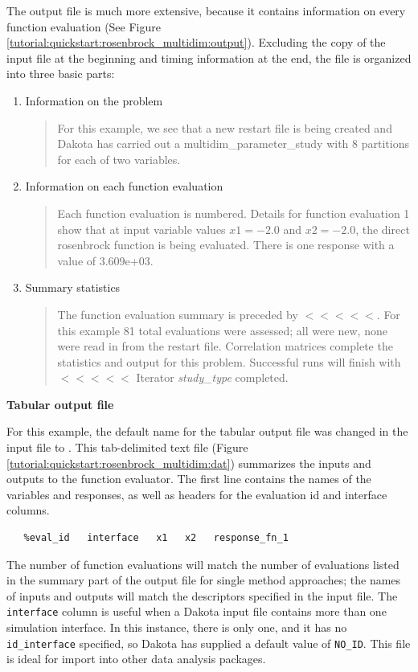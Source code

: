 The output file is much more extensive, because it
contains information on every function evaluation (See Figure
\ref{tutorial:quickstart:rosenbrock_multidim:output}). Excluding the
copy of the input file at the beginning and timing information at the end,
the file is organized into three basic parts:
\begin{enumerate}
\item Information on the problem
\begin{quote}
For this example, we see that a new restart file is being created
and Dakota has carried out a multidim\_parameter\_study with
8 partitions for each of two variables.
\end{quote}
\item Information on each function evaluation 
\begin{quote}
Each function evaluation is numbered. Details for function evaluation
1 show that at input variable values $x1= -2.0$ and $x2=-2.0$, 
the direct rosenbrock function is being evaluated.  There is one response
with a value of 3.609e+03.
\end{quote}
\item Summary statistics
\begin{quote}
The function evaluation summary is preceded by $<<<<<$. For this
example 81 total evaluations were assessed; all were new, none were
read in from the restart file. Correlation matrices complete the statistics
and output for this problem. Successful runs will finish with
$<<<<<$ Iterator {\it study\_type} completed.
\end{quote}
\end{enumerate}

{\textbf{Tabular output file}}

For this example, the default name for the tabular output file 
 was changed in the input file to
. This tab-delimited text file
(Figure \ref{tutorial:quickstart:rosenbrock_multidim:dat})
summarizes the inputs and outputs to the function evaluator.
The first line contains the names of the variables and responses,
as well as headers for the evaluation id and interface columns.
\begin{verbatim}
   %eval_id   interface   x1   x2   response_fn_1 
\end{verbatim}
The number of function evaluations will match the number of 
evaluations listed in the summary part of the output file for
single method approaches; the names of inputs and outputs will match 
the descriptors specified in the input file. The \texttt{interface} 
column is useful when a Dakota input file contains more than one 
simulation interface. In this instance, there is only one, and
it has no \texttt{id\_interface} specified, so Dakota has supplied
a default value of \texttt{NO\_ID}. This file is ideal for import into
other data analysis packages.


